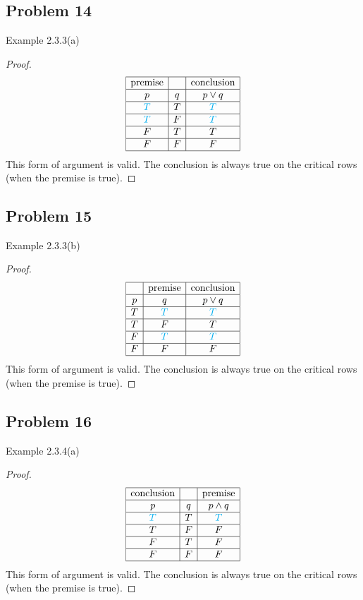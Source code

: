 \documentclass[14pt]{extarticle}
\begin{document}
\subsection{Problem 14}
Example 2.3.3(a)

\begin{proof}
$$
\begin{array}{|c|c|c|}
\hline
\text{premise} & & \text{conclusion}\\
\hline
p & q & p \vee q \\
\hline
\color{cyan} T & T & \color{cyan} T \\
\hline
\color{cyan} T & F & \color{cyan} T \\
\hline
F & T & T \\
\hline
F & F & F \\
\hline
\end{array}
$$
This form of argument is valid. The conclusion is always true on the critical
rows (when the premise is true).
\end{proof}

\subsection{Problem 15}
Example 2.3.3(b)

\begin{proof}
$$
\begin{array}{|c|c|c|}
\hline
 & \text{premise} & \text{conclusion}\\
\hline
p & q & p \vee q \\
\hline
T & \color{cyan} T & \color{cyan} T \\
\hline
T & F & T \\
\hline
F & \color{cyan} T & \color{cyan} T \\
\hline
F & F & F \\
\hline
\end{array}
$$
This form of argument is valid. The conclusion is always true on the critical
rows (when the premise is true).
\end{proof}

\subsection{Problem 16}
Example 2.3.4(a)

\begin{proof}
$$
\begin{array}{|c|c|c|}
\hline
\text{conclusion} & & \text{premise} \\
\hline
p & q & p \wedge q \\
\hline
\color{cyan} T & T & \color{cyan} T \\
\hline
T & F & F \\
\hline
F & T & F \\
\hline
F & F & F \\
\hline
\end{array}
$$
This form of argument is valid. The conclusion is always true on the critical
rows (when the premise is true).
\end{proof}
\end{document}
